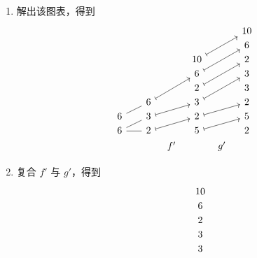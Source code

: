 \begin{example}
\begin{enumerate}
\[\begin{tikzcd}[row sep = 1, column sep = 8]
 & & 2 \ar[urr,-] & & 3& & & & 3\\
6 \ar[uurr,mapsto] & & 6 \ar[rr,-] \ar[urr,-] & & 2 & & \ar[ull,-] \ar[uull,-] \ar[uuull,-] \ar[uuuull,-] 360 \ar[uurr,mapsto] & & 10\\
6 \ar[urr,mapsto] & & 5 \ar[rr,-]& & 5 & & \ar[ull,-] \ar[ll,-] 10 \ar[urr,mapsto] & & 2\\
 & f & & & & & & g & \\
        \end{tikzcd}\]
        \item 解出该图表，得到
        \[ \begin{tikzcd} [row sep = 1, column sep = 8]
         & &  & &   & & 10\\
         & &  & &   & & 6 \\
         & &  & &10 \ar[uurr,mapsto]& & 2 \\
        & &   & & 6 \ar[uurr,mapsto]& & 3 \\
        & &   & & 2 \ar[uurr,mapsto]& & 3 \\
        & &  6 \ar[uurr,mapsto] & & 3 \ar[uurr,mapsto] & & 2 \\
       6 \ar[rru,-]& &  3 \ar[urr,mapsto] & & 2 \ar[urr,mapsto] & & 5 \\
       6  \ar[rr,-] \ar[urr,-] & & 2 \ar[urr,mapsto] & & 5 \ar[urr,mapsto]  & & 2 \\
        & & & f' & & g' &
        \end{tikzcd} \]
        \item 复合 $f'$ 与 $g'$，得到
        \[ \begin{tikzcd} [row sep = 1, column sep = 8]
        & &  & & 10\\
        & &  & & 6 \\
        & &  & & 2 \\
        & & & & 3 \\
        & & & & 3 \\

\end{tikzcd}\]
\end{enumerate}
\end{example}
